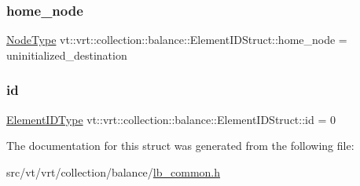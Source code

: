 \subsubsection{\texorpdfstring{home\+\_\+node}{home\_node}}
{\footnotesize\ttfamily \hyperlink{namespacevt_a866da9d0efc19c0a1ce79e9e492f47e2}{Node\+Type} vt\+::vrt\+::collection\+::balance\+::\+Element\+I\+D\+Struct\+::home\+\_\+node = uninitialized\+\_\+destination}

\mbox{\label{structvt_1_1vrt_1_1collection_1_1balance_1_1_element_i_d_struct_a3acb6937689a2fa83dbaac464fee4c54}} 
\subsubsection{\texorpdfstring{id}{id}}
{\footnotesize\ttfamily \hyperlink{namespacevt_1_1vrt_1_1collection_1_1balance_a14c8d2c972f2913aa3f1636e5be0a120}{Element\+I\+D\+Type} vt\+::vrt\+::collection\+::balance\+::\+Element\+I\+D\+Struct\+::id = 0}



The documentation for this struct was generated from the following file\+:\begin{DoxyCompactItemize}
\item 
src/vt/vrt/collection/balance/\hyperlink{lb__common_8h}{lb\+\_\+common.\+h}\end{DoxyCompactItemize}

